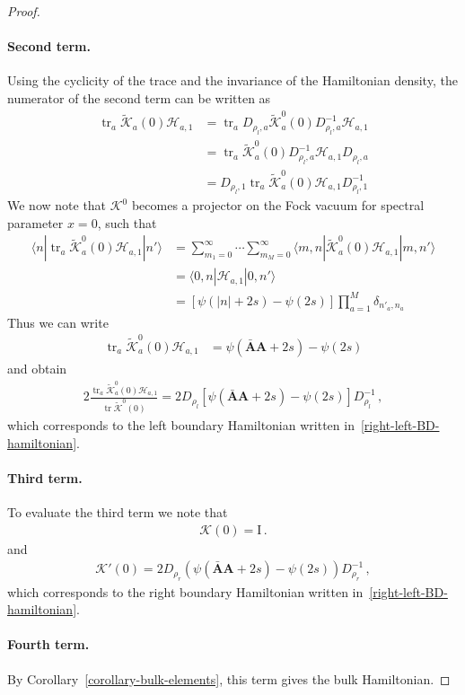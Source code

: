 \documentclass[11pt]{article}
\numberwithin{equation}{section}
\newcommand{\OA}{\mathbf{A}}
\newcommand{\OAD}{\mathbf{\bar{A}}}
\newcommand{\M}{M}
\newcommand{\ID}{\mathrm{I}}
\newcommand{\eH}{\mathcal{H}}
\newcommand{\K}{\widetilde{\mathcal{K}}^{0}}
\newcommand{\KhatFull}{\mathcal{K}}
\newcommand{\Kfull}{\widetilde{\mathcal{K}}}
\DeclareMathOperator{\tr}{\text{tr}}
\begin{document}
\begin{proof}
\paragraph{Second term.}
Using the cyclicity of the trace  and the invariance of the Hamiltonian density, the  numerator of the second term can be written as
\begin{equation}
\begin{split}
\tr_a \Kfull_{a}(0)\eH_{a,1} &=\tr_a D_{\rho_l,a}\K_{a}(0)D^{-1}_{\rho_l,a}\eH_{a,1}\\&=\tr_a \K_{a}(0)D^{-1}_{\rho_l,a}\eH_{a,1}D_{\rho_l,a}\\&=D_{\rho_l,1}\tr_a \K_a(0)\eH_{a,1}D_{\rho_l,1}^{-1}
 \end{split}
\end{equation} 
We now note that $\mathcal{K}^0$ becomes a projector on the Fock vacuum for spectral parameter $x=0$, such that  
\begin{equation}\label{eq:projK}
\begin{split}
\langle n|
\tr_a \K_{a}(0)\mathcal{H}_{a,1}|n'\rangle&=\sum_{m_1=0}^{\infty}\cdots\sum_{m_\M=0}^\infty
\langle m,n| \K_{a}(0)\eH_{a,1}|m,n'\rangle\\&= \langle 0,n|  \eH_{a,1}|0,n'\rangle
\\&=\left[\psi(|n|+2s)-\psi (2s)\right] \prod_{a=1}^{\M} \delta_{n'_a,n_a}
 \end{split}
\end{equation}
Thus we can write
\begin{equation}
\begin{split}
\tr_a \K_{a}(0) \eH_{a,1} &=\psi(\OAD\OA+2s)-\psi (2s)
 \end{split}
\end{equation} and obtain
\begin{equation}\label{left-BD-Hamiltonian-from-K}
\begin{split}
2\frac{\tr_a \K_a(0)\eH_{a,1}  }{ \tr\K(0)}=2 D_{\rho_l}\left[\psi(\OAD\OA+2s)-\psi (2s)\right] D_{\rho_l}^{-1}\,,
 \end{split}
\end{equation} which corresponds to the left boundary Hamiltonian written in~\eqref{right-left-BD-hamiltonian}.
\paragraph{Third term.} To evaluate the third term we note that
\begin{align}
		   \KhatFull(0)=\ID\,.
	\end{align}
and
\begin{align}\label{right-BD-Hamiltonian-from-K}
		   \KhatFull'(0)= 2D_{\rho_{r}}\left(\psi(\OAD\OA+2s)-\psi(2s)\right )D_{\rho_{r}}^{-1}\,,
	\end{align}
    which corresponds to the right boundary Hamiltonian written in~\eqref{right-left-BD-hamiltonian}.
    \paragraph{Fourth term.} By Corollary~\ref{corollary-bulk-elements}, this term gives the bulk Hamiltonian. 
\end{proof}
\end{document}
